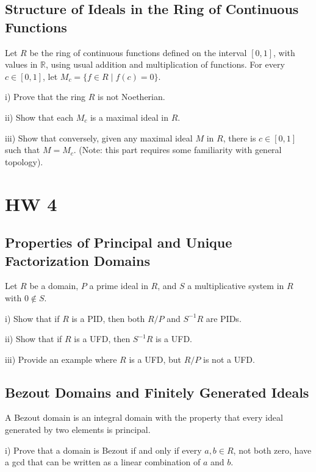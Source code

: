 \documentclass[lang=cn,11pt]{template}
\begin{document}
\section{Structure of Ideals in the Ring of Continuous Functions}
Let \( R \) be the ring of continuous functions defined on the interval \([0, 1]\), with values in \( \mathbb{R} \), using usual addition and multiplication of functions. For every \( c \in [0, 1] \), let \( M_c = \{ f \in R \mid f(c) = 0 \} \).

i) Prove that the ring \( R \) is not Noetherian.

ii) Show that each \( M_c \) is a maximal ideal in \( R \).

iii) Show that conversely, given any maximal ideal \( M \) in \( R \), there is \( c \in [0, 1] \) such that \( M = M_c \). (Note: this part requires some familiarity with general topology).









\chapter{HW 4}

\section{Properties of Principal and Unique Factorization Domains}
Let \( R \) be a domain, \( P \) a prime ideal in \( R \), and \( S \) a multiplicative system in \( R \) with \( 0 \notin S \).

i) Show that if \( R \) is a PID, then both \( R/P \) and \( S^{-1}R \) are PIDs.

ii) Show that if \( R \) is a UFD, then \( S^{-1}R \) is a UFD.

iii) Provide an example where \( R \) is a UFD, but \( R/P \) is not a UFD.

\section{Bezout Domains and Finitely Generated Ideals}
A Bezout domain is an integral domain with the property that every ideal generated by two elements is principal.

i) Prove that a domain is Bezout if and only if every \( a, b \in R \), not both zero, have a gcd that can be written as a linear combination of \( a \) and \( b \).
\end{document}
